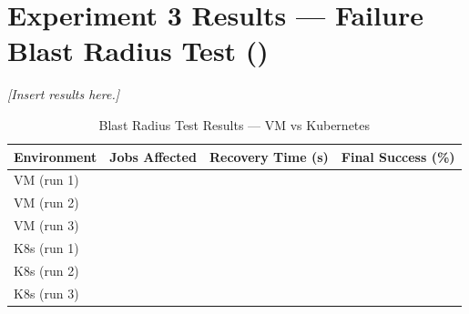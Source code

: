 \section{Experiment 3 Results --- Failure Blast Radius Test ()}

\textit{[Insert results here.]}

\begin{table}[H]
\centering
\caption{Blast Radius Test Results --- VM vs Kubernetes}
\label{tab:blast_results}
\begin{tabularx}{\textwidth}{lXXX}
\toprule
\textbf{Environment} & \textbf{Jobs Affected} & \textbf{Recovery Time (s)} & \textbf{Final Success (\%)} \\
\midrule
VM (run 1) & & & \\
VM (run 2) & & & \\
VM (run 3) & & & \\
K8s (run 1)& & & \\
K8s (run 2)& & & \\
K8s (run 3)& & & \\
\bottomrule
\end{tabularx}
\end{table}
